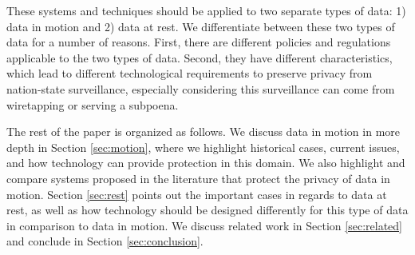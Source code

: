 These systems and techniques should be applied to two separate types of data: 1) data in 
motion and 2) data at rest.  We differentiate between these two types of data for a number of reasons.  
First, there are different policies and regulations applicable to the two types of data.  Second, 
they have different characteristics, which lead to different technological requirements to preserve 
privacy from nation-state surveillance, especially considering this surveillance can come from  
wiretapping or serving a subpoena.

The rest of the paper is organized as follows.  We discuss data in motion in more depth in Section \ref{sec:motion}, where we highlight 
historical cases, current issues, and how technology can provide protection in this domain.  We also highlight and compare
systems proposed in the literature that protect the privacy of data in motion. Section \ref{sec:rest} 
points out the important cases in regards to data at rest, as well as how technology should be designed 
differently for this type of data in comparison to data in motion.  We discuss related work in Section \ref{sec:related} and 
conclude in Section \ref{sec:conclusion}.
